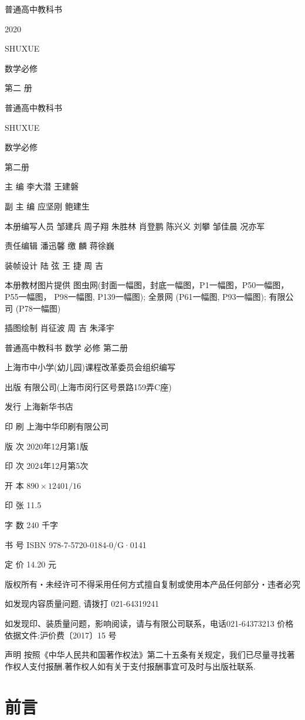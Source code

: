 \documentclass[10pt]{article}
\begin{document}
普通高中教科书

2020

SHUXUE

数学必修

第二 册



普通高中教科书

SHUXUE

数学必修

第二册



主 编 李大潜 王建磐

副 主 编 应坚刚 鲍建生

本册编写人员 邹建兵 周子翔 朱胜林 肖登鹏 陈兴义 刘攀 邹佳晨 况亦军

责任编辑 潘迅馨 缴 麟 蒋徐巍

装帧设计 陆 弦 王 捷 周 吉

本册教材图片提供 图虫网(封面一幅图，封底一幅图，P1一幅图，P50一幅图，P55一幅图， P98一幅图, P139一幅图); 全景网 (P61一幅图, P93一幅图); 有限公司 (P78一幅图)

插图绘制 肖征波 周 吉 朱泽宇

普通高中教科书 数学 必修 第二册

上海市中小学(幼儿园)课程改革委员会组织编写

出版 有限公司(上海市闵行区号景路159弄C座)

发行 上海新华书店

印 刷 上海中华印刷有限公司

版 次 2020年12月第1版

印 次 2024年12月第5次

开 本 \({890} \times  {1240}\mathrm{1/{16}}\)

印 张 11.5

字 数 240 千字

书 号 ISBN 978-7-5720-0184-0/G·0141

定 价 14.20 元

版权所有・未经许可不得采用任何方式擅自复制或使用本产品任何部分・违者必究

如发现内容质量问题, 请拨打 021-64319241

如发现印、装质量问题，影响阅读，请与有限公司联系，电话021-64373213 价格依据文件:沪价费〔2017〕15 号

声明 按照《中华人民共和国著作权法》第二十五条有关规定，我们已尽量寻找著作权人支付报酬.著作权人如有关于支付报酬事宜可及时与出版社联系.

\section*{前言}
\end{document}
